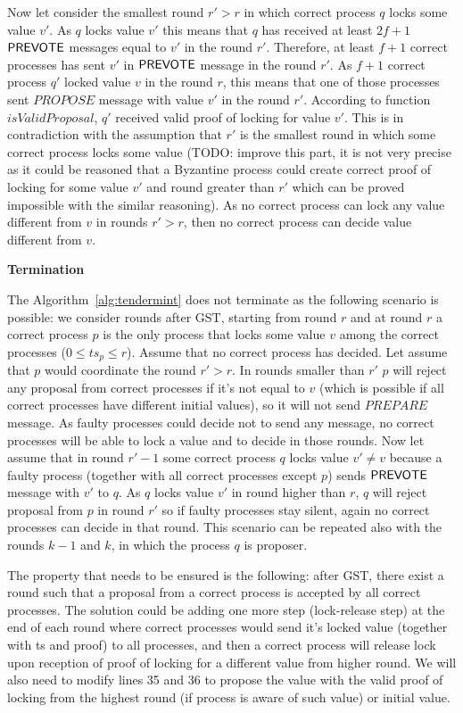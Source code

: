 Now let consider the smallest round $r' > r$ in which correct process $q$ locks some value $v'$. As $q$ locks value $v'$ this means that $q$ has received at least $2f+1$ $\mathsf{PREVOTE}$ messages equal to $v'$ in the round $r'$. Therefore, at least $f+1$ correct processes has sent $v'$ in $\mathsf{PREVOTE}$ message in the round $r'$. As $f+1$ correct process $q'$ locked value $v$ in the round $r$, this means that one of those processes sent $PROPOSE$ message with value $v'$ in the round $r'$. According to function $isValidProposal$, $q'$ received valid proof of locking for value $v'$. This is in contradiction with the assumption that $r'$ is the smallest round in which some correct process locks some value (TODO: improve this part, it is not very precise as it could be reasoned that a Byzantine process could create correct proof of locking for some value $v'$ and round greater than $r'$ which can be proved impossible with the similar reasoning). As no correct process can lock any value different from $v$ in rounds $r' > r$, then no correct process can decide value different from $v$. 

\textbf{Termination} 

The Algorithm~\ref{alg:tendermint} does not terminate as the following scenario is possible: we consider rounds after GST, starting from round $r$ and at round $r$ a correct process $p$ is the only process that locks some value $v$ among the correct processes ($0 \le ts_p \le r$). Assume that no correct process has decided. Let assume that $p$ would coordinate the round $r'>r$. In rounds smaller than $r'$ $p$ will reject any proposal from correct processes if it's not equal to $v$ (which is possible if all correct processes have different initial values), so it will not send $PREPARE$ message. As faulty processes could decide not to send any message, no correct processes will be able to lock a value and to decide in those rounds. Now let assume that in round $r'-1$ some correct process $q$ locks value $v' \neq v$ because a faulty process (together with all correct processes except $p$) sends $\mathsf{PREVOTE}$ message with $v'$ to $q$. As $q$ locks value $v'$ in round higher than $r$, $q$ will reject proposal from $p$ in round $r'$ so if faulty processes stay silent, again no correct processes can decide in that round. This scenario can be repeated also with the rounds $k-1$ and $k$, in which the process $q$ is proposer.

The property that needs to be ensured is the following: after GST, there exist a round such that a proposal from a correct process is accepted by all correct processes. The solution could be adding one more step (lock-release step) at the end of each round where correct processes would send it's locked value (together with ts and proof) to all processes, and then a correct process will release lock upon reception of proof of locking for a different value from higher round. We will also need to modify lines 35 and 36 to propose the value with the valid proof of locking from the highest round (if process is aware of such value) or initial value.

            


